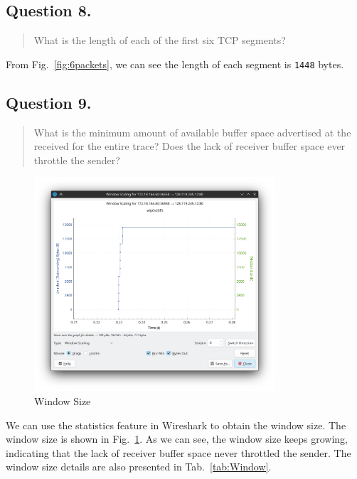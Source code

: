 \documentclass{cshwk}
\begin{document}
\subsection*{Question 8.}
\begin{quote}
    What is the length of each of the first six TCP segments?
\end{quote}

From Fig.~\ref{fig:6packets}, we can see the length of each segment is \texttt{1448} bytes.

\subsection*{Question 9.}
\begin{quote}
    What is the minimum amount of available buffer space advertised at the received for the entire trace? Does the lack of receiver buffer space ever throttle the sender?
\end{quote}

\begin{figure}[htbp]
    \centering
    \includegraphics[width=0.8\textwidth]{./lab3-7.png}
    \caption{Window Size}
    \label{fig:Window}
\end{figure}

We can use the statistics feature in Wireshark to obtain the window size. The window size is shown in Fig.~\ref{fig:Window}. As we can see, the window size keeps growing, indicating that the lack of receiver buffer space never throttled the sender. The window size details are also presented in Tab.~\ref{tab:Window}.
\end{document}

